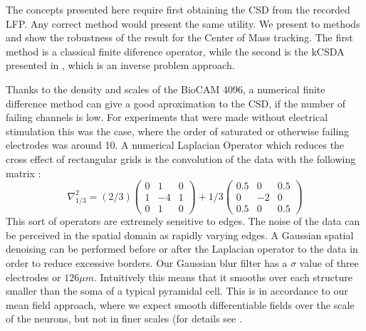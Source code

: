 \documentclass{article}
\begin{document}
The concepts presented here require first obtaining the CSD from the recorded LFP. Any correct method would present the same utility. We present to methods and show the robustness of the result for the Center of Mass tracking. The first method is a classical finite diference operator, while the second is the kCSDA presented in \cite{Potworowski2011}, which is an inverse problem approach.

Thanks to the density and scales of the BioCAM 4096, a numerical finite difference method
can give a good aproximation to the CSD, if the number of failing channels is low. For experiments that were made without electrical stimulation this was the case, where the order of saturated or otherwise failing electrodes was around 10.  A  numerical Laplacian Operator which reduces the cross effect of rectangular grids is the convolution of the data with the following matrix \cite{Lindberg90}:
\begin{equation}
\nabla^2_{1/3}=(2/3)
\begin{pmatrix}
  0 & 1 & 0 \\
  1 & -4 & 1 \\
  0 & 1 & 0
\end{pmatrix}
+1/3
\begin{pmatrix}
  0.5 & 0 & 0.5 \\
  0 & -2 & 0 \\
  0.5 & 0 & 0.5
\end{pmatrix}  
\end{equation}
This sort of operators are extremely sensitive to edges. The noise of the data can be perceived in the spatial domain as rapidly varying edges. A Gaussian spatial denoising can be performed before or after the Laplacian operator to the data in order to reduce excessive borders. Our Gaussian blur filter has a $\sigma$ value of three electrodes or $126 \mu m$. Intuitively this means that it smooths over each structure smaller than the soma of a typical pyramidal cell. 
This is  in accordance to our mean field approach, where we expect smooth differentiable fields over the scale of the neurons, but not in finer scales (for details see \cite{Bedard11}.
\end{document}
